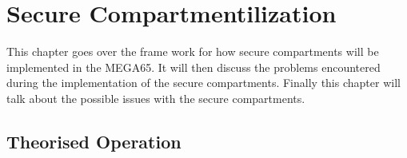 
\chapter{Secure Compartmentilization} %

\label{Chapter 6} %

This chapter goes over the frame work for how secure compartments will be implemented in the MEGA65. It will then discuss the problems encountered during the implementation of the secure compartments. Finally this chapter will talk about the possible issues with the secure compartments.


\section{Theorised Operation}

\label{Ch6 Sec1}

